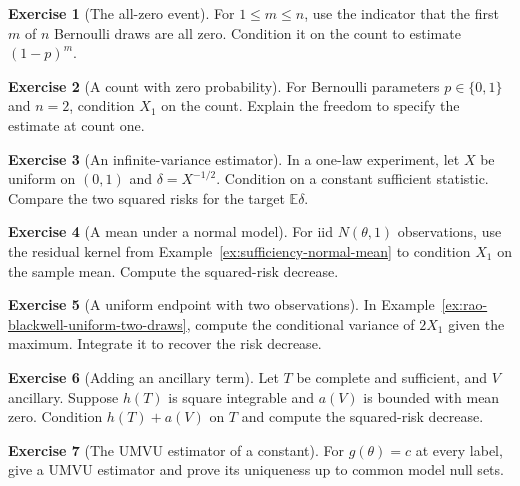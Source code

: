 \documentclass[11pt,oneside]{book}
\theoremstyle{definition}
\newtheorem{exercise}{Exercise}[section]
\theoremstyle{remark}
\begin{document}
\begin{exercise}[The all-zero event]
\label{exer:umvu-bernoulli-no-success}
For $1\leq m\leq n$, use the indicator that the first $m$ of $n$
Bernoulli draws are all zero. Condition it on the count to estimate
$(1-p)^m$.
\end{exercise}

\begin{exercise}[A count with zero probability]
\label{exer:rao-blackwell-null-count}
For Bernoulli parameters $p\in\{0,1\}$ and $n=2$, condition
$X_1$ on the count. Explain the freedom to specify the estimate
at count one.
\end{exercise}

\begin{exercise}[An infinite-variance estimator]
\label{exer:rao-blackwell-integrable-not-square}
In a one-law experiment, let $X$ be uniform on $(0,1)$ and
$\delta=X^{-1/2}$. Condition on a constant sufficient statistic.
Compare the two squared risks for the target $\mathbb E\delta$.
\end{exercise}

\begin{exercise}[A mean under a normal model]
\label{exer:rao-blackwell-normal-first}
For iid $N(\theta,1)$ observations, use the residual kernel from
Example~\ref{ex:sufficiency-normal-mean} to condition $X_1$ on the
sample mean. Compute the squared-risk decrease.
\end{exercise}

\begin{exercise}[A uniform endpoint with two observations]
\label{exer:rao-blackwell-uniform-conditional-variance}
In Example~\ref{ex:rao-blackwell-uniform-two-draws}, compute the
conditional variance of $2X_1$ given the maximum. Integrate it
to recover the risk decrease.
\end{exercise}

\begin{exercise}[Adding an ancillary term]
\label{exer:rao-blackwell-ancillary-noise}
Let $T$ be complete and sufficient, and $V$ ancillary. Suppose
$h(T)$ is square integrable and $a(V)$ is bounded with mean zero.
Condition $h(T)+a(V)$ on $T$ and compute the squared-risk decrease.
\end{exercise}

\begin{exercise}[The UMVU estimator of a constant]
\label{exer:umvu-constant}
For $g(\theta)=c$ at every label, give a UMVU estimator and prove
its uniqueness up to common model null sets.
\end{exercise}
\end{document}
